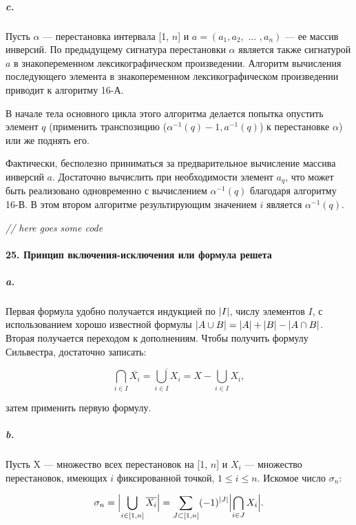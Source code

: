 \documentclass{../../template/mai_book}
\DeclarePairedDelimiter{\abs}{\lvert}{\rvert}
\begin{document}
\subparagraph{c.} Пусть $\alpha$ — перестановка интервала [1, $n$] и $a = (a_1, a_2, \text{ ... }, a_n)$ — ее массив инверсий. По предыдущему сигнатура перестановки $\alpha$ является также сигнатурой $a$ в знакопеременном лексикографическом произведении. Алгоритм вычисления последующего элемента в знакопеременном лексикографическом произведении приводит к алгоритму 16-А.

В начале тела основного цикла этого алгоритма делается попытка опустить элемент $q$ (применить транспозицию ($\alpha^{-1}(q) - 1, a^{-1}(q)$) к перестановке $\alpha$) или же поднять его.

\newpage


Фактически, бесполезно приниматься за предварительное вычисление массива инверсий $a$. Достаточно вычислить при необходимости элемент $a_q$, что может быть реализовано одновременно с вычислением $\alpha^{-1}(q)$ благодаря алгоритму 16-В. В этом втором алгоритме результирующим значением $i$ является $\alpha^{-1}(q)$. \newline

\textit{// here goes some code}

\paragraph{25. Принцип включения-исключения или формула решета}

\subparagraph{a.} Первая формула удобно получается индукцией по $\abs{I}$, числу элементов $I$, с использованием хорошо известной формулы $\abs{A \cup B} = \abs{A} + \abs{B} - \abs{A \cap B}$. Вторая получается переходом к дополнениям. Чтобы получить формулу Сильвестра, достаточно записать:

\begin{equation*}
\bigcap_{i \in I} \overline{X_i} = \overline{\bigcup_{i \in I} X_i} = X - \bigcup_{i \in I} X_i,
\end{equation*}

\noindent
затем применить первую формулу.

\subparagraph{b.} Пусть X — множество всех перестановок на [1, $n$] и $X_i$ —  множество перестановок, имеющих $i$ фиксированной точкой, $1 \leqslant i \leqslant n$. Искомое число $\sigma_n$:

\begin{equation*}
\sigma_n = \abs[\Big]{\bigcup_{i \in [1, n]} \overline{X_i}} = \sum_{J \subset [1, n]} (-1)^{\abs{J}} \abs[\Big]{\bigcap_{i \in J} X_i}.
\end{equation*}
\end{document}
